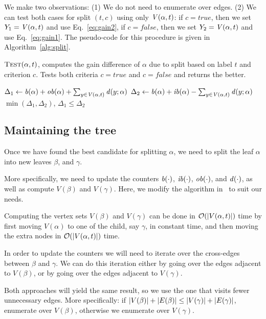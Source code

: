 We make two observations:
(1) We do not need to enumerate over edges.
(2) We can test both cases for split $(t, c)$ using only $\labeldic{\alpha, t}$:
if $c = \mathit{true}$,
then we set $Y_1 = \labeldic{\alpha, t}$ and use Eq.~\ref{eq:gain2},
if $c = \mathit{false}$,
then we set $Y_2 = \labeldic{\alpha, t}$ and use Eq.~\ref{eq:gain1}.
The pseudo-code for this procedure is given in Algorithm~\ref{alg:split}.


\begin{algorithm}[ht!]
\caption{$\textsc{Test}(\alpha,t)$, computes the gain difference of $\alpha$ due to
split based on label $t$ and criterion $c$. Tests both criteria $c = \mathit{true}$
and $c = \mathit{false}$ and returns the better.
}
\label{alg:split}
	$\Delta_1 \define \back{\alpha} + \outback{\alpha}  + \sum_{y \in \labeldic{\alpha,t}} \diff{y; \alpha}$\; 
	$\Delta_2 \define \back{\alpha} + \inback{\alpha} - \sum_{y \in \labeldic{\alpha,t}} \diff{y; \alpha}$\; 
	\Return $\min (\Delta_1, \Delta_2)$, $\Delta_1 \leq \Delta_2$\;
\end{algorithm}


\subsection{Maintaining the tree}

Once we have found the best candidate for splitting $\alpha$, we need to split
the leaf $\alpha$ into new leaves $\beta$, and $\gamma$.

More specifically, we need to update the counters $\back{\cdot}$,
$\inback{\cdot}$, $\outback{\cdot}$, and $\diff{\cdot}$, as well as compute
$V(\beta)$ and $V(\gamma)$. Here, we modify the algorithm in~\citep{nikolaj2017tiers} to suit
our needs.

Computing the vertex sets $V(\beta)$ and $V(\gamma)$ can be done
in $\bigO{\abs{V(\alpha, t)}}$ time by first moving $V(\alpha)$
to one of the child, say $\gamma$, in constant time,
and then moving the extra nodes in $\bigO{\abs{V(\alpha, t)}}$ time.

In order to update the counters we will need to iterate over the cross-edges between
$\beta$ and $\gamma$. We can do this iteration either by going over the edges
adjacent to $V(\beta)$, or by going over the edges adjacent to $V(\gamma)$. 

Both approaches will yield the same result, so we use the one that
visits fewer unnecessary edges. More specifically: if ${\left|V(\beta)\right|} + {\left|E(\beta)\right|} \leq {\left|V(\gamma)\right|} + {\left|E(\gamma)\right|}$,
enumerate over $V(\beta)$, otherwise we enumerate over $V(\gamma)$.

